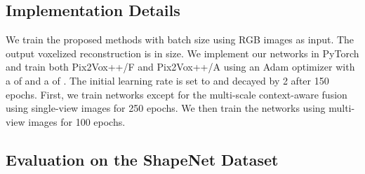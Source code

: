 \documentclass[twocolumn]{svjour3}
\begin{document}
\subsection{Implementation Details}

We train the proposed methods with batch size  using  RGB images as input.
The output voxelized reconstruction is  in size.
We implement our networks in PyTorch \citep{DBLP:conf/nips/AdamSSGEZZALA17} and train both Pix2Vox++/F and Pix2Vox++/A using an Adam optimizer \citep{DBLP:conf/iclr/KingmaB15} with a  of  and a  of .
The initial learning rate is set to  and decayed by 2 after 150 epochs.
First, we train networks except for the multi-scale context-aware fusion using single-view images for 250 epochs.
We then train the networks using multi-view images for 100 epochs.

\subsection{Evaluation on the ShapeNet Dataset}
\end{document}
